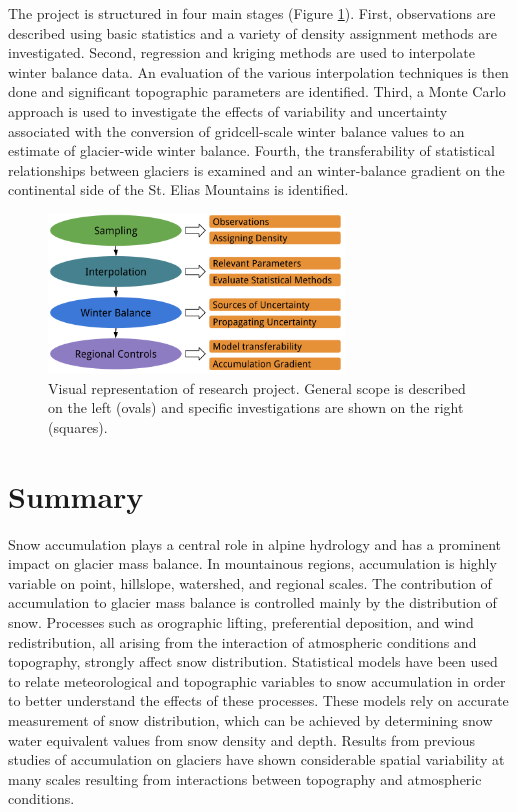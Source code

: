 \documentclass{sfuthesis}
\begin{document}
The project is structured in four main stages (Figure \ref{fig:flowchart_project}). First, observations are described using basic statistics and a variety of density assignment methods are investigated. Second, regression and kriging methods are used to interpolate winter balance data. An evaluation of the various interpolation techniques is then done and significant topographic parameters are identified. Third, a Monte Carlo approach is  used to investigate the effects of variability and uncertainty associated with the conversion of gridcell-scale winter balance values to an estimate of glacier-wide winter balance. Fourth, the transferability of statistical relationships between glaciers is examined and an winter-balance gradient on the continental side of the St. Elias Mountains is identified.



 \begin{figure}
 \centering
           \includegraphics[width =0.7\textwidth]{MastersFlow.png}
       \caption{Visual representation of research project. General scope is described on the left (ovals) and specific investigations are shown on the right (squares).}
       \label{fig:flowchart_project}
\end{figure}
 



\section{Summary}
Snow accumulation plays a central role in alpine hydrology and has a prominent impact on glacier mass balance. In mountainous regions, accumulation is highly variable on point, hillslope, watershed, and regional scales. The contribution of accumulation to glacier mass balance is controlled mainly by the distribution of snow. Processes such as orographic lifting, preferential deposition, and wind redistribution, all arising from the interaction of atmospheric conditions and topography, strongly affect snow distribution. Statistical models have been used to relate meteorological and topographic variables to snow accumulation in order to better understand the effects of these processes. These models rely on accurate measurement of snow distribution, which can be achieved by determining snow water equivalent values from snow density and depth. Results from previous studies of accumulation on glaciers have shown considerable spatial variability at many scales resulting from interactions between topography and atmospheric conditions. 
\end{document}
